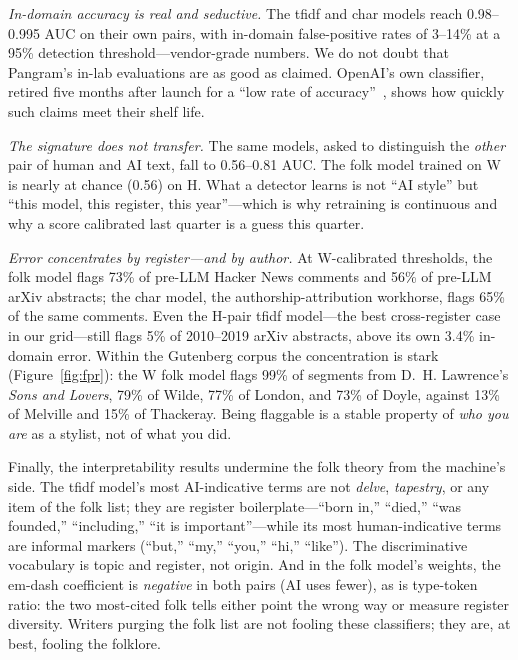 \documentclass[sigconf,nonacm]{acmart}
\begin{document}
\noindent\emph{In-domain accuracy is real and seductive.} The tfidf and char models reach 0.98--0.995 AUC on their own pairs, with in-domain false-positive rates of 3--14\% at a 95\% detection threshold---vendor-grade numbers. We do not doubt that Pangram's in-lab evaluations are as good as claimed. OpenAI's own classifier, retired five months after launch for a ``low rate of accuracy''~\cite{r9}, shows how quickly such claims meet their shelf life.

\noindent\emph{The signature does not transfer.} The same models, asked to distinguish the \emph{other} pair of human and AI text, fall to 0.56--0.81 AUC. The folk model trained on W is nearly at chance (0.56) on H. What a detector learns is not ``AI style'' but ``this model, this register, this year''---which is why retraining is continuous and why a score calibrated last quarter is a guess this quarter.

\noindent\emph{Error concentrates by register---and by author.} At W-calibrated thresholds, the folk model flags 73\% of pre-LLM Hacker News comments and 56\% of pre-LLM arXiv abstracts; the char model, the authorship-attribution workhorse, flags 65\% of the same comments. Even the H-pair tfidf model---the best cross-register case in our grid---still flags 5\% of 2010--2019 arXiv abstracts, above its own 3.4\% in-domain error. Within the Gutenberg corpus the concentration is stark (Figure~\ref{fig:fpr}): the W folk model flags 99\% of segments from D.~H. Lawrence's \emph{Sons and Lovers}, 79\% of Wilde, 77\% of London, and 73\% of Doyle, against 13\% of Melville and 15\% of Thackeray. Being flaggable is a stable property of \emph{who you are} as a stylist, not of what you did.

Finally, the interpretability results undermine the folk theory from the machine's side. The tfidf model's most AI-indicative terms are not \emph{delve}, \emph{tapestry}, or any item of the folk list; they are register boilerplate---``born in,'' ``died,'' ``was founded,'' ``including,'' ``it is important''---while its most human-indicative terms are informal markers (``but,'' ``my,'' ``you,'' ``hi,'' ``like''). The discriminative vocabulary is topic and register, not origin. And in the folk model's weights, the em-dash coefficient is \emph{negative} in both pairs (AI uses fewer), as is type-token ratio: the two most-cited folk tells either point the wrong way or measure register diversity. Writers purging the folk list are not fooling these classifiers; they are, at best, fooling the folklore.
\end{document}
